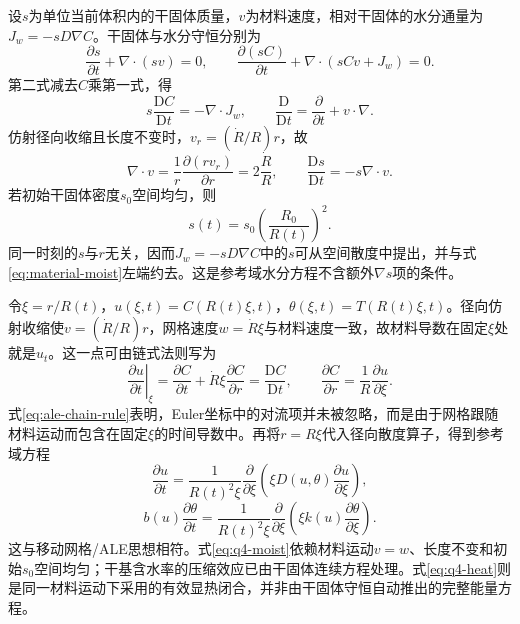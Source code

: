 设$s$为单位当前体积内的干固体质量，$v$为材料速度，相对干固体的水分通量为$J_w=-sD\nabla C$。干固体与水分守恒分别为
\begin{equation}
\frac{\partial s}{\partial t}+\nabla\cdot(sv)=0,
\qquad
\frac{\partial(sC)}{\partial t}+\nabla\cdot(sCv+J_w)=0.
\end{equation}
第二式减去$C$乘第一式，得
\begin{equation}
s\frac{\mathrm DC}{\mathrm Dt}=-\nabla\cdot J_w,
\qquad
\frac{\mathrm D}{\mathrm Dt}=\frac{\partial}{\partial t}+v\cdot\nabla.
\label{eq:material-moist}
\end{equation}
仿射径向收缩且长度不变时，$v_r=(\dot R/R)r$，故
\begin{equation}
\nabla\cdot v=\frac{1}{r}\frac{\partial(rv_r)}{\partial r}
=2\frac{\dot R}{R},\qquad
\frac{\mathrm Ds}{\mathrm Dt}=-s\nabla\cdot v.
\end{equation}
若初始干固体密度$s_0$空间均匀，则
\begin{equation}
s(t)=s_0\left(\frac{R_0}{R(t)}\right)^2.
\label{eq:dry-solid-density}
\end{equation}
同一时刻的$s$与$r$无关，因而$J_w=-sD\nabla C$中的$s$可从空间散度中提出，并与式\eqref{eq:material-moist}左端约去。这是参考域水分方程不含额外$\nabla s$项的条件。

令$\xi=r/R(t)$，$u(\xi,t)=C(R(t)\xi,t)$，$\theta(\xi,t)=T(R(t)\xi,t)$。径向仿射收缩使$v=(\dot R/R)r$，网格速度$w=\dot R\xi$与材料速度一致，故材料导数在固定$\xi$处就是$u_t$。这一点可由链式法则写为
\begin{equation}
\left.\frac{\partial u}{\partial t}\right|_{\xi}
=\frac{\partial C}{\partial t}+\dot R\xi\frac{\partial C}{\partial r}
=\frac{\mathrm DC}{\mathrm Dt},
\qquad
\frac{\partial C}{\partial r}=\frac{1}{R}\frac{\partial u}{\partial\xi}.
\label{eq:ale-chain-rule}
\end{equation}
式\eqref{eq:ale-chain-rule}表明，Euler坐标中的对流项并未被忽略，而是由于网格跟随材料运动而包含在固定$\xi$的时间导数中。再将$r=R\xi$代入径向散度算子，得到参考域方程
\begin{equation}
\frac{\partial u}{\partial t}
=\frac{1}{R(t)^2\xi}\frac{\partial}{\partial\xi}
\left(\xi D(u,\theta)\frac{\partial u}{\partial\xi}\right),
\label{eq:q4-moist}
\end{equation}
\begin{equation}
b(u)\frac{\partial\theta}{\partial t}
=\frac{1}{R(t)^2\xi}\frac{\partial}{\partial\xi}
\left(\xi k(u)\frac{\partial\theta}{\partial\xi}\right).
\label{eq:q4-heat}
\end{equation}
这与移动网格/ALE思想相符\cite{kjellgren1998}。式\eqref{eq:q4-moist}依赖材料运动$v=w$、长度不变和初始$s_0$空间均匀；干基含水率的压缩效应已由干固体连续方程处理。式\eqref{eq:q4-heat}则是同一材料运动下采用的有效显热闭合，并非由干固体守恒自动推出的完整能量方程。


